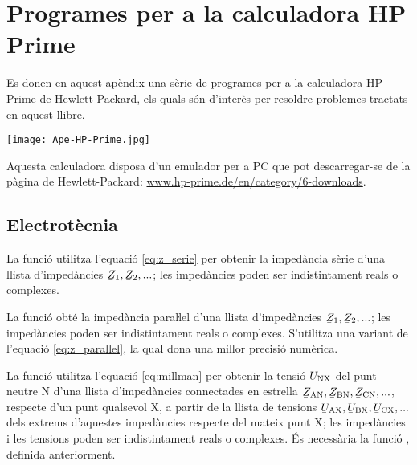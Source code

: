 \chapter{Programes per a la calculadora \textsf{HP Prime}}\label{sec:progs-HP}

\lstset{
	language=HPPRIME,
	basicstyle=\small\sf,
	numbers=left,
	frame=lines
}

Es donen en aquest apèndix una sèrie de programes per a la calculadora \textsf{HP Prime} de Hewlett-Packard, els quals són d'interès per resoldre problemes tractats en aquest llibre.

\begin{center}
\texttt{[image: Ape-HP-Prime.jpg]}
\end{center}

Aquesta calculadora disposa d'un emulador per a PC que pot descarregar-se de la pàgina de Hewlett-Packard: \href{http://www.hp-prime.de/en/category/6-downloads}{www.hp-prime.de/en/category/6-downloads}.

\section{Electrotècnia}\label{sec:HP_ELC}

La funció  utilitza l'equació \eqref{eq:z_serie} per obtenir la impedància sèrie d'una llista d'impedàncies $\cmplx{Z}_1, \cmplx{Z}_2, ...$; les impedàncies poden ser indistintament reals o complexes.




La funció  obté la impedància paraŀlel  d'una llista d'impedàncies $\cmplx{Z}_1, \cmplx{Z}_2, ...$; les impedàncies poden ser indistintament reals o complexes. S'utilitza una variant de l'equació \eqref{eq:z_parallel}, la qual dona una millor precisió numèrica.




La funció  utilitza l'equació \eqref{eq:millman} per obtenir la tensió $\cmplx{U}\ped{NX}$ del punt neutre N d'una llista d'impedàncies connectades en estrella $\cmplx{Z}\ped{AN}, \cmplx{Z}\ped{BN}, \cmplx{Z}\ped{CN}, ...$, respecte d'un punt qualsevol X, a partir de la llista de tensions $\cmplx{U}\ped{AX}, \cmplx{U}\ped{BX}, \cmplx{U}\ped{CX}, ...$ dels extrems d'aquestes impedàncies respecte del mateix punt X; les impedàncies i les tensions poden ser indistintament reals o complexes. És necessària la funció , definida anteriorment.

